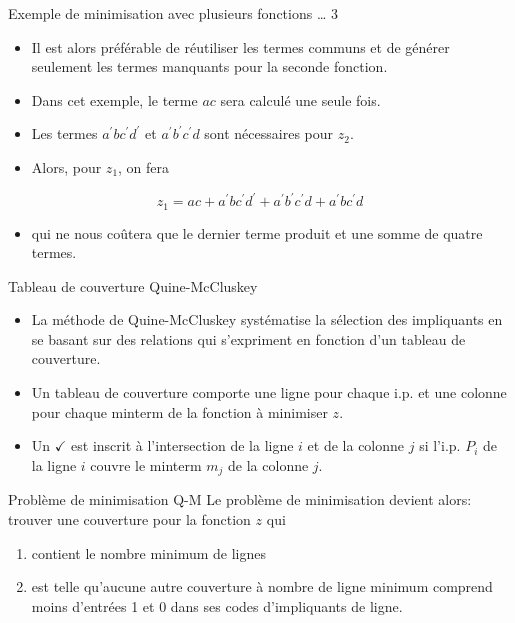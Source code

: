 \documentclass[presentation]{beamer}
\begin{document}
\begin{frame}[label={sec:org2c7ace7}]{Exemple de minimisation avec plusieurs fonctions \ldots{} 3}
\begin{itemize}
\item Il est alors préférable de réutiliser les termes communs et de générer seulement les termes manquants pour la seconde fonction.

\item Dans cet exemple, le terme \(a c\) sera calculé une seule fois.

\item Les termes \(a^{\prime} b c^{\prime} d^{\prime}\) et \(a^{\prime} b^{\prime} c^{\prime} d\) sont nécessaires pour \(z_2\).

\item Alors, pour \(z_1\), on fera
\end{itemize}

$$ z_1 = a c + a^{\prime} b c^{\prime} d^{\prime} + a^{\prime} b^{\prime} c^{\prime} d + a^{\prime} b c^{\prime} d $$

\begin{itemize}
\item qui ne nous coûtera que le dernier terme produit et une somme de quatre termes.
\end{itemize}
\end{frame}


\begin{frame}[label={sec:org68fe4ba}]{Tableau de couverture Quine-McCluskey}
\begin{itemize}
\item La méthode de Quine-McCluskey systématise la sélection des impliquants en se basant sur des relations qui s'expriment en fonction d'un tableau de couverture.

\item Un \alert{tableau de couverture} comporte une ligne pour chaque i.p. et une colonne pour chaque minterm de la fonction à minimiser \(z\).

\item Un \(\checkmark\) est inscrit à l'intersection de la ligne \(i\) et de la colonne \(j\) si l'i.p.  \(P_i\) de la ligne \(i\) couvre le minterm \(m_j\) de la colonne \(j\).
\end{itemize}
\end{frame}

\begin{frame}[label={sec:orgba54797}]{Problème de minimisation Q-M}
Le problème de minimisation devient alors: trouver une couverture pour
la fonction \(z\) qui

\begin{enumerate}
\item contient le nombre minimum de lignes

\item est telle qu'aucune autre couverture à nombre de ligne minimum
comprend moins d'entrées 1 et 0 dans ses codes d'impliquants de
ligne.
\end{enumerate}
\end{frame}
\end{document}
